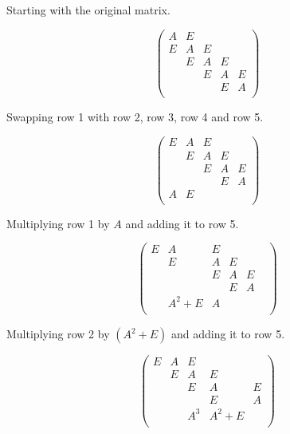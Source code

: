 \documentclass[a4paper, 12pt]{article}
\begin{document}
Starting with the original matrix.
\begin{singlespace}
\begin{equation*}
\begin{pmatrix}
A&E&&&\\
E&A&E&&\\
&E&A&E&\\
&&E&A&E\\
&&&E&A\\
\end{pmatrix}
\end{equation*}
\end{singlespace}
Swapping row 1 with row 2, row 3, row 4 and row 5.
\vspace{-0.5cm}
\begin{singlespace}
\begin{equation*}
\begin{pmatrix}
E&A&E&&\\
&E&A&E&\\
&&E&A&E\\
&&&E&A\\
A&E&&&\\
\end{pmatrix}
\end{equation*}
\end{singlespace}
Multiplying row 1 by $A$ and adding it to row 5.
\vspace{-0.5cm}
\begin{singlespace}
\begin{equation*}
\begin{pmatrix}
E&A&E&&\\
&E&A&E&\\
&&E&A&E\\
&&&E&A\\
&A^2+E&A&&&\\
\end{pmatrix}
\end{equation*}
\end{singlespace}
Multiplying row 2 by $(A^2 + E)$ and adding it to row 5.
\vspace{-0.5cm}
\begin{singlespace}
\begin{equation*}
\begin{pmatrix}
E&A&E&&\\
&E&A&E&\\
&&E&A&E\\
&&&E&A\\
&&A^3&A^2+E&\\
\end{pmatrix}
\end{equation*}
\end{singlespace}
\end{document}
